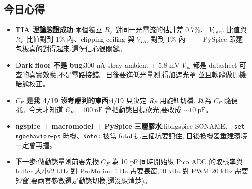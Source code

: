 \subsection*{今日心得}

\begin{itemize}[leftmargin=2em,itemsep=0pt]
  \item \textbf{TIA 理論驗證成功}:兩個獨立 \(R_F\) 對同一光電流的估計差 0.7\%、
        \(V_\text{OUT}\) 比值與 \(R_F\) 比值對到 1\% 內、clipping ceiling 與 \(V_{DD}\)
        對到 1\% 內 —— PySpice 跟麵包板真的對得起來,這份信心很關鍵。
  \item \textbf{Dark floor 不是 bug}:300 nA stray ambient + 5.8 mV \(V_{os}\) 都是
        datasheet 可查的真實效應,不是電路接錯。日後要進低光量測,得加遮光罩
        並且軟體做開機暗態校正。
  \item \textbf{\(C_F\) 是我 4/19 沒考慮到的東西}:4/19 只決定 \(R_F\) 用旋鈕切檔,
        以為 \(C_F\) 隨便挑。今天才知道 \(C_F = \SI{100}{\nano\farad}\)
        會把動態目標砍光,要改成 \(\sim \SI{10}{\pico\farad}\)。
  \item \textbf{ngspice + macromodel + PySpice 三層膠水}:libngspice SONAME、
        \texttt{set ngbehavior=ps} 時機、\texttt{Note:} 被當 fatal 這三個坑要記住,
        日後換機器重建環境一定會再撞。
  \item \textbf{下一步}:做動態量測前要先換 \(C_F\) 為 10 pF;同時開始想 Pico ADC
        的取樣率與 buffer 大小(2 kHz 對 ProMotion 1 Hz 需要長窗,10 kHz 對 PWM
        20 kHz 需要短窗,要兩套參數還是動態切換,還沒想清楚)。
\end{itemize}
